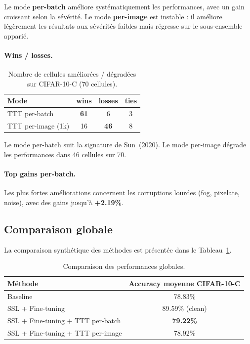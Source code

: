 \documentclass[12pt,a4paper]{report}
\begin{document}
	Le mode \textbf{per-batch} améliore systématiquement les performances, avec un gain croissant selon la sévérité.  
	Le mode \textbf{per-image} est instable : il améliore légèrement les résultats aux sévérités faibles mais régresse sur le sous-ensemble apparié.
	
	\paragraph{Wins / losses.}
	
	\begin{table}[H]
		\centering
		\begin{tabular}{lccc}
			\toprule
			Mode & wins & losses & ties \\
			\midrule
			TTT per-batch & \textbf{61} & 6 & 3 \\
			TTT per-image (1k) & 16 & \textbf{46} & 8 \\
			\bottomrule
		\end{tabular}
		\caption{Nombre de cellules améliorées / dégradées sur CIFAR-10-C (70 cellules).}
	\end{table}
	
	Le mode per-batch suit la signature de Sun~(2020).  
	Le mode per-image dégrade les performances dans 46 cellules sur 70.
	
	\paragraph{Top gains per-batch.}
	
	Les plus fortes améliorations concernent les corruptions lourdes (fog, pixelate, noise), avec des gains jusqu’à \textbf{+2.19\%}.
	
	\subsection{Comparaison globale}
	
	La comparaison synthétique des méthodes est présentée dans le Tableau~\ref{tab:global_comparison}.
	
	\begin{table}[H]
		\centering
		\begin{tabular}{lc}
			\toprule
			\textbf{Méthode} & \textbf{Accuracy moyenne CIFAR-10-C} \\
			\midrule
			Baseline & 78.83\% \\
			SSL + Fine-tuning & 89.59\% (clean) \\
			SSL + Fine-tuning + TTT per-batch & \textbf{79.22\%} \\
			SSL + Fine-tuning + TTT per-image & 78.92\% \\
			\bottomrule
		\end{tabular}
		\caption{Comparaison des performances globales.}
		\label{tab:global_comparison}
	\end{table}
	
\end{document}
